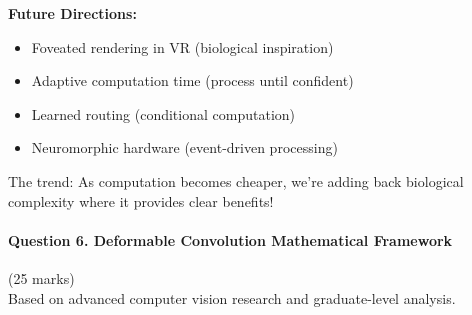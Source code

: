 \documentclass[12pt]{article}
\begin{document}
\begin{enumerate}[(a)]
{{    \textbf{Future Directions:}
    \begin{itemize}
        \item Foveated rendering in VR (biological inspiration)
        \item Adaptive computation time (process until confident)
        \item Learned routing (conditional computation)
        \item Neuromorphic hardware (event-driven processing)
    \end{itemize}
    
    The trend: As computation becomes cheaper, we're adding back biological complexity where it provides clear benefits!
    }
    }
\end{enumerate}

\newpage
\paragraph{Question 6. Deformable Convolution Mathematical Framework}{{\hfill (25 marks)}}\\
Based on advanced computer vision research and graduate-level analysis.
\end{document}
